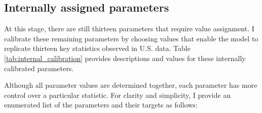 \documentclass[parskip=full]{article}
\begin{document}
\subsection{Internally assigned parameters}\label{sec:internal_calib}

At this stage, there are still thirteen parameters that require value assignment. I calibrate these remaining parameters by choosing values that enable the model to replicate thirteen key statistics observed in U.S. data. Table \ref{tab:internal_calibration} provides descriptions and values for these internally calibrated parameters.

Although all parameter values are determined together, each parameter has more control over a particular statistic. For clarity and simplicity, I provide an enumerated list of the parameters and their targets as follows:
\end{document}
